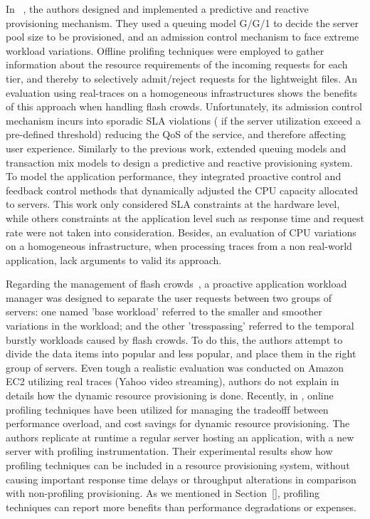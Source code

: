 In ~\cite{urgaonkar_agile_2008, urgaonkar_cataclysm:_2008}, the authors designed and implemented a predictive and reactive provisioning mechanism. They used a queuing model  G/G/1 to decide the server pool size to be provisioned, and an admission control mechanism to face extreme workload variations. Offline prolifing techniques were employed to gather information about the resource requirements of the incoming requests for each tier, and thereby to selectively admit/reject requests for the lightweight files.  An evaluation using real-traces on a homogeneous infrastructures shows the benefits of this approach when handling flash crowds. Unfortunately, its admission control mechanism incurs into sporadic SLA violations ( if the server utilization exceed a pre-defined threshold) reducing the QoS of the service, and therefore affecting user experience. Similarly to the previous work, \cite{wang_appraise:_2009} extended queuing models and transaction mix models to design a predictive and reactive provisioning system. To model the application performance, they integrated proactive control and feedback control methods that dynamically adjusted the CPU capacity allocated to servers. This work only considered SLA constraints at the hardware level, while others constraints at the application level such as response time and request rate were not taken into consideration. Besides, an evaluation of CPU variations on a homogeneous infrastructure, when processing traces from a non real-world application, lack arguments to valid its approach.


Regarding the management of flash crowds~\cite{zhang_resilient_2009}, a proactive application workload manager was designed to separate the user requests between two groups of servers:  one  named  'base workload'  referred to the smaller and smoother variations in the workload; and the other 'tresspassing' referred to the temporal burstly workloads caused by flash crowds. To do this, the authors attempt to divide the data items into popular and less popular, and place them in the right group of servers. Even tough a realistic evaluation was conducted on Amazon EC2 utilizing real traces (Yahoo video streaming), authors do not explain in details how the dynamic resource provisioning is done. Recently, in  \cite{kaviani_profiling-as--service:_2011}, online profiling techniques have been utilized for managing the tradeofff between performance overload, and cost savings for dynamic resource provisioning. The authors replicate at runtime a regular server hosting an application, with a new server with profiling instrumentation. Their experimental results show how profiling techniques can be included in a resource provisioning system, without causing important response time delays or throughput alterations in comparison with non-profiling provisioning. As we mentioned in Section~\ref{}, profiling techniques can report more benefits than  performance degradations or expenses.


